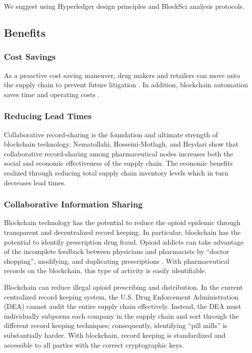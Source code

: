 \documentclass[sigconf]{acmart}
\begin{document}
We suggest using Hyperledger design principles \cite{Cocco01} \cite{Hyperledger01} and BlockSci \cite{Kalodner01} analysis protocols.

\subsection{Benefits}
\subsubsection{Cost Savings} As a proactive cost saving maneuver, drug makers and retailers can move onto the supply chain to prevent future litigation \cite{Noguchi01}. In addition, blockchain automation saves time and operating costs \cite{Hyperledger01}.  
\subsubsection{Reducing Lead Times} Collaborative record-sharing is the foundation and ultimate strength of blockchain technology. Nematollahi, Hosseini-Motlagh, and Heydari \cite{Nematollahi01} show that collaborative record-sharing among pharmaceutical nodes increases both the social and economic effectiveness of the supply chain. The economic benefits realized through reducing total supply chain inventory levels which in turn decreases lead times. 
\subsubsection{Collaborative Information Sharing} Blockchain technology has the potential to reduce the opioid epidemic through transparent and decentralized record keeping. In particular, blockchain has the potential to identify prescription drug fraud. Opioid addicts can take advantage of the incomplete feedback between physicians and pharmacists by ``doctor shopping'', modifying, and duplicating prescriptions \cite{hitchingHealthcare}. With pharmaceutical records on the blockchain, this type of activity is easily identifiable. 

Blockchain can reduce illegal opioid prescribing and distribution. In the current centralized record keeping system, the U.S. Drug Enforcement Administration (DEA) cannot audit the entire supply chain effectively. Instead, the DEA must individually subpoena each company in the supply chain and sort through the different record keeping techniques; consequently, identifying ``pill mills'' is substantially harder. With blockchain, record keeping is standardized and accessible to all parties with the correct cryptographic keys. 
\end{document}
